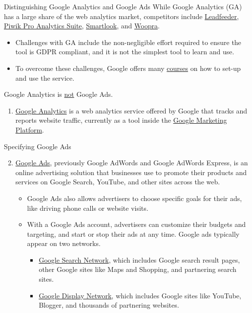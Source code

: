 \documentclass[pdf]{beamer}
\theoremstyle{remark}
\theoremstyle{definition}
\begin{document}
\begin{frame}[t]{Distinguishing Google Analytics and Google Ads}
While Google Analytics (GA) has a large share of the web analytics market, competitors include \href{https://www.leadfeeder.com/}{Leadfeeder}, \href{https://piwik.pro/}{Piwik Pro Analytics Suite}, \href{https://www.smartlook.com/}{Smartlook}, and \href{https://www.woopra.com/}{Woopra}.
\begin{itemize}
\item Challenges with GA include the non-negligible effort required to ensure the tool is GDPR compliant, and it is not the simplest tool to learn and use.  
\item To overcome these challenges, Google offers many \href{https://skillshop.exceedlms.com/student/catalog/browse}{courses} on how to set-up and use the service.
\end{itemize}
Google Analytics is \underline{not} Google Ads.  
\begin{enumerate}
  \item \href{https://marketingplatform.google.com/about/analytics/}{Google Analytics} is a web analytics service offered by Google that tracks and reports website traffic, currently as a tool inside the \href{https://support.google.com/marketingplatform/answer/9013946?hl=en}{Google Marketing Platform}. 
\end{enumerate}
\end{frame}

\begin{frame}[t]{Specifying Google Ads}
\begin{enumerate}
  \setcounter{enumi}{1}
    \item \href{https://ads.google.com/home/faq/}{Google Ads}, previously Google AdWords and Google AdWords Express, is an online advertising solution that businesses use to promote their products and services on Google Search, YouTube, and other sites across the web.
    \begin{itemize}
      \item Google Ads also allows advertisers to choose specific goals for their ads, like driving phone calls or website visits. 
      \item With a Google Ads account, advertisers can customize their budgets and targeting, and start or stop their ads at any time. Google ads typically appear on two networks. 
      \begin{itemize}
         \item \href{https://support.google.com/google-ads/answer/1722047}{Google Search Network}, which includes Google search result pages, other Google sites like Maps and Shopping, and partnering search sites. 
         \item \href{https://support.google.com/google-ads/answer/2404190?hl=en}{Google Display Network}, which includes Google sites like YouTube, Blogger, and thousands of partnering websites.
      \end{itemize}
    \end{itemize}
\end{enumerate}
\end{frame}
\end{document}
